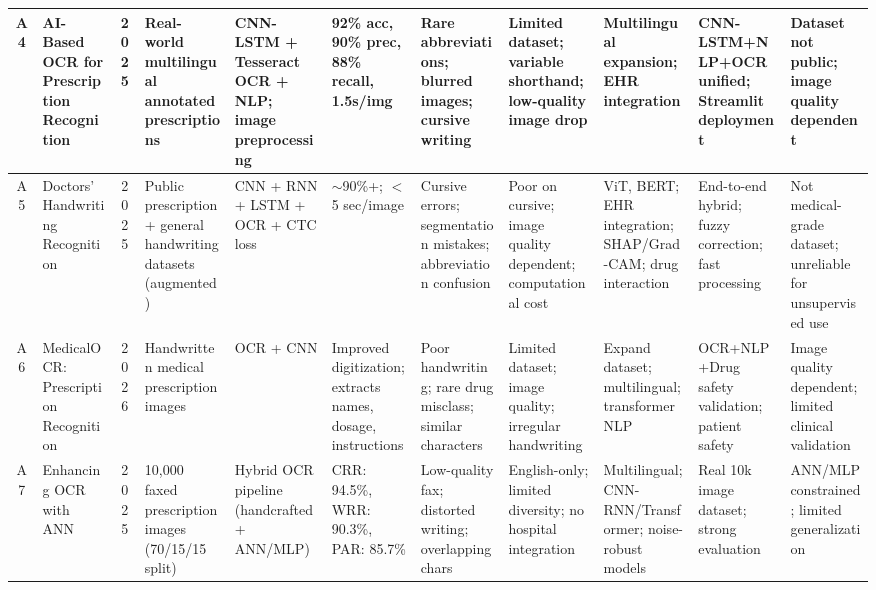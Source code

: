 \documentclass[conference]{IEEEtran}
\begin{document}
\begin{table}[!htbp]
{\begin{tabular}{|c|p{2.2cm}|c|p{2.2cm}|p{2.2cm}|p{1.8cm}|p{1.8cm}|p{1.8cm}|p{2.0cm}|p{1.8cm}|p{1.8cm}|}
A4 & AI-Based OCR for Prescription Recognition  & 2025 &
Real-world multilingual annotated prescriptions &
CNN-LSTM + Tesseract OCR + NLP; image preprocessing &
92\% acc, 90\% prec, 88\% recall, 1.5s/img &
Rare abbreviations; blurred images; cursive writing &
Limited dataset; variable shorthand; low-quality image drop &
Multilingual expansion; EHR integration &
CNN-LSTM+NLP+OCR unified; Streamlit deployment &
Dataset not public; image quality dependent \\
\hline

A5 & Doctors' Handwriting Recognition  & 2025 &
Public prescription + general handwriting datasets (augmented) &
CNN + RNN + LSTM + OCR + CTC loss &
 $\sim$90\%+; $<$5 sec/image &
Cursive errors; segmentation mistakes; abbreviation confusion &
Poor on cursive; image quality dependent; computational cost &
ViT, BERT; EHR integration; SHAP/Grad-CAM; drug interaction &
End-to-end hybrid; fuzzy correction; fast processing &
Not medical-grade dataset; unreliable for unsupervised use \\
\hline

A6 & MedicalOCR: Prescription Recognition  & 2026 &
Handwritten medical prescription images &
OCR + CNN &
Improved digitization; extracts names, dosage, instructions &
Poor handwriting; rare drug misclass; similar characters &
Limited dataset; image quality; irregular handwriting &
Expand dataset; multilingual; transformer NLP &
OCR+NLP+Drug safety validation; patient safety &
Image quality dependent; limited clinical validation \\
\hline

A7 & Enhancing OCR with ANN  & 2025 &
10,000 faxed prescription images (70/15/15 split) &
Hybrid OCR pipeline (handcrafted + ANN/MLP) &
CRR: 94.5\%, WRR: 90.3\%, PAR: 85.7\% &
Low-quality fax; distorted writing; overlapping chars &
English-only; limited diversity; no hospital integration &
Multilingual; CNN-RNN/Transformer; noise-robust models &
Real 10k image dataset; strong evaluation &
ANN/MLP constrained; limited generalization \\
\hline
\end{tabular}
}
\end{table}
\end{document}
